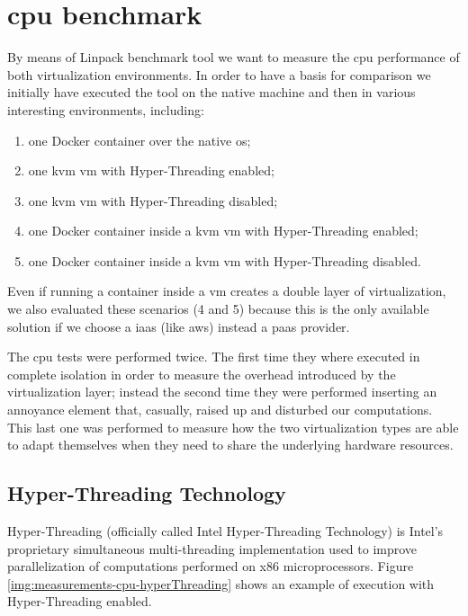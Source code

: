 %
%
\section{\acs{cpu} benchmark}
\label{sec:measurements-cpu}
By means of Linpack benchmark tool we want to measure the \acs{cpu} performance of both virtualization
environments. In order to have a basis for comparison we initially have executed the tool on the native
machine and then in various interesting environments, including:

\begin{enumerate}
	\item{one Docker container over the native \acs{os};}
	\item{one \ac{kvm} \ac{vm} with Hyper-Threading enabled;}
	\item{one \ac{kvm} \ac{vm} with Hyper-Threading disabled;}
	\item{one Docker container inside a \ac{kvm} \ac{vm} with Hyper-Threading enabled;}
	\item{one Docker container inside a \ac{kvm} \ac{vm} with Hyper-Threading disabled.}
\end{enumerate}

Even if running a container inside a \ac{vm} creates a double layer of virtualization, we also evaluated
these scenarios (4 and 5) because this is the only available solution if we choose a \ac{iaas} (like 
\ac{aws}) instead a \ac{paas} provider.

The \acs{cpu} tests were performed twice. The first time they where executed in complete isolation
in order to measure the overhead introduced by the virtualization layer; instead the second time they
were performed inserting an annoyance element that, casually, raised up and disturbed our computations.
This last one was performed to measure how the two virtualization types are able to adapt themselves
when they need to share the underlying hardware resources.

\subsection{Hyper-Threading Technology}
\label{sec:measurements-cpu-hyperThreadingTechnology}
Hyper-Threading (officially called Intel Hyper-Threading Technology) is Intel's proprietary simultaneous
multi-threading implementation used to improve parallelization of computations performed on x86
microprocessors. Figure \ref{img:measurements-cpu-hyperThreading} shows an example of execution with
Hyper-Threading enabled.

